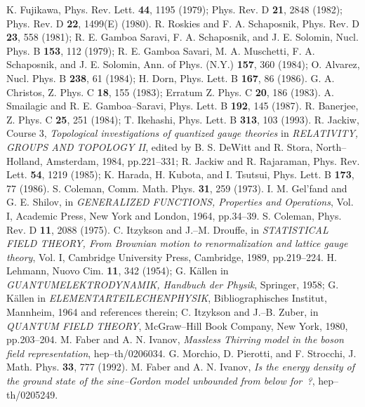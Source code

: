 \documentclass[a4paper,12pt] {article}
\begin{document}
\begin{thebibliography}{9}
\bibitem{[19]} 
K. Fujikawa, Phys. Rev. Lett. {\bf 44}, 1195 (1979);
Phys. Rev. D {\bf 21}, 2848 (1982); Phys. Rev. D {\bf 22}, 1499(E)
(1980).
\bibitem{[20]}
R. Roskies and F. A. Schaposnik,
Phys. Rev. D {\bf 23}, 558 (1981);
R. E. Gamboa Saravi, F. A. Schaposnik, and J. E. Solomin,
Nucl. Phys. B {\bf 153}, 112 (1979);
R. E. Gamboa Savari, M. A. Muschetti, F. A. Schaposnik, 
and J. E. Solomin,
Ann. of Phys. (N.Y.) {\bf 157}, 360 (1984);
O. Alvarez,
Nucl. Phys. B {\bf 238}, 61 (1984);
H. Dorn,
Phys. Lett. B {\bf 167}, 86 (1986).
\bibitem{[21]}
G. A. Christos,
Z. Phys. C {\bf 18}, 155 (1983); 
Erratum Z. Phys. C {\bf 20}, 186 (1983).
\bibitem{[22]}
A. Smailagic and R. E. Gamboa--Saravi,
Phys. Lett. B {\bf 192}, 145 (1987).
\bibitem{[23]}
R. Banerjee,
Z. Phys. C {\bf 25}, 251 (1984);
T. Ikehashi,
Phys. Lett. B {\bf 313}, 103 (1993).
\bibitem{[24]}
R. Jackiw, 
Course 3, {\it Topological investigations of quantized 
gauge theories} in {\it RELATIVITY, GROUPS AND TOPOLOGY II}, 
edited by B. S. DeWitt and R. Stora, North--Holland, 
Amsterdam, 1984, pp.221--331;
R. Jackiw and R. Rajaraman,
Phys. Rev. Lett. {\bf 54}, 1219 (1985);
K. Harada, H. Kubota, and I. Tsutsui,
Phys. Lett. B {\bf 173}, 77 (1986).
\bibitem{[25]}
S. Coleman,
Comm. Math. Phys. {\bf 31}, 259 (1973).
\bibitem{[26]}
I. M. Gel'fand and G. E. Shilov,
in {\it GENERALIZED FUNCTIONS, Properties and Operations}, Vol. I, 
Academic Press, New York and London, 1964, pp.34--39.
\bibitem{[27]}
S. Coleman,
Phys. Rev. D {\bf 11}, 2088 (1975).
\bibitem{[28]}
C. Itzykson and J.--M. Drouffe,
in {\it STATISTICAL FIELD THEORY, From Brownian motion to 
renormalization and lattice gauge theory}, Vol. I, Cambridge 
University Press, Cambridge, 1989, pp.219--224.
\bibitem{[29]}
H. Lehmann,
Nuovo Cim. {\bf 11}, 342 (1954);
G. K\"allen in 
{\it GUANTUMELEKTRODYNAMIK, Handbuch der Physik}, Springer, 1958;
G. K\"allen in
{\it ELEMENTARTEILECHENPHYSIK}, Bibliographisches Institut, 
Mannheim,
1964 and references therein;
C. Itzykson and J.--B. Zuber,
in {\it QUANTUM FIELD THEORY}, McGraw--Hill Book Company, 
New York, 1980, pp.203--204.
\bibitem{[30]}
M. Faber and A. N. Ivanov,
{\it Massless Thirring model in the boson field representation},
 hep--th/0206034.
\bibitem{[31]}
G. Morchio, D. Pierotti, and F. Strocchi,
J. Math. Phys. {\bf 33}, 777 (1992).
\bibitem{[32]}
M. Faber and A. N. Ivanov,
{\it Is the energy density of the ground state of the sine--Gordon
model unbounded from below for \coordHE{}\,?}, 
hep--th/0205249.
\end{thebibliography}
\end{document}
